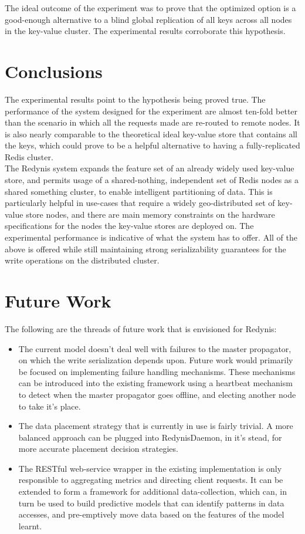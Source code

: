 \documentclass{sig-alternate}
\begin{document}
The ideal outcome of the experiment was to prove that the optimized option is a good-enough alternative to a blind global replication of all keys across all nodes in the key-value cluster. The experimental results corroborate this hypothesis.\\


\section{Conclusions}
The experimental results point to the hypothesis being proved true. The performance of the system designed for the experiment are almost ten-fold better than the scenario in which all the requests made are re-routed to remote nodes. It is also nearly comparable to the theoretical ideal key-value store that contains all the keys, which could prove to be a helpful alternative to having a fully-replicated Redis cluster.\\

The Redynis system expands the feature set of an already widely used key-value store, and permits usage of a shared-nothing, independent set of Redis nodes as a shared something cluster, to enable intelligent partitioning of data. This is particularly helpful in use-cases that require a widely geo-distributed set of key-value store nodes, and there are main memory constraints on the hardware specifications for the nodes the key-value stores are deployed on. The experimental performance is indicative of what the system has to offer. All of the above is offered while still maintaining strong serializability guarantees for the write operations on the distributed cluster.\\


\section{Future Work}
The following are the threads of future work that is envisioned for Redynis:

\begin{itemize}
	\item The current model doesn't deal well with failures to the master propagator, on which the write serialization depends upon. Future work would primarily be focused on implementing failure handling mechanisms. These mechanisms can be introduced into the existing framework using a heartbeat mechanism to detect when the master propagator goes offline, and electing another node to take it's place.
	\item The data placement strategy that is currently in use is fairly trivial. A more balanced approach can be plugged into RedynisDaemon, in it's stead, for more accurate placement decision strategies.
	\item The RESTful web-service wrapper in the existing implementation is only responsible to aggregating metrics and directing client requests. It can be extended to form a framework for additional data-collection, which can, in turn be used to build predictive models that can identify patterns in data accesses, and pre-emptively move data based on the features of the model learnt.
\end{itemize}
\end{document}
